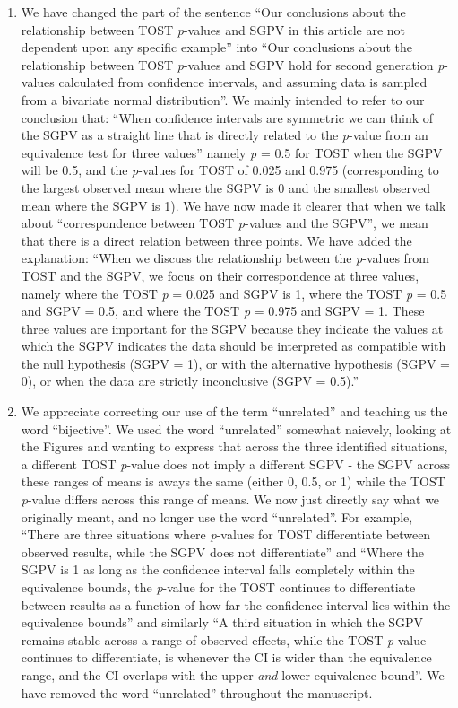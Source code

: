 \documentclass[man]{apa6}
\begin{document}
\begin{enumerate}
\def\labelenumi{\arabic{enumi}.}
\item
  We have changed the part of the sentence \enquote{Our conclusions about the relationship between TOST \emph{p}-values and SGPV in this article are not dependent upon any specific example} into \enquote{Our conclusions about the relationship between TOST \emph{p}-values and SGPV hold for second generation \emph{p}-values calculated from confidence intervals, and assuming data is sampled from a bivariate normal distribution}. We mainly intended to refer to our conclusion that: \enquote{When confidence intervals are symmetric we can think of the SGPV as a straight line that is directly related to the \emph{p}-value from an equivalence test for three values} namely \emph{p} = 0.5 for TOST when the SGPV will be 0.5, and the \emph{p}-values for TOST of 0.025 and 0.975 (corresponding to the largest observed mean where the SGPV is 0 and the smallest observed mean where the SGPV is 1). We have now made it clearer that when we talk about \enquote{correspondence between TOST \emph{p}-values and the SGPV}, we mean that there is a direct relation between three points. We have added the explanation: \enquote{When we discuss the relationship between the \emph{p}-values from TOST and the SGPV, we focus on their correspondence at three values, namely where the TOST \emph{p} = 0.025 and SGPV is 1, where the TOST \emph{p} = 0.5 and SGPV = 0.5, and where the TOST \emph{p} = 0.975 and SGPV = 1. These three values are important for the SGPV because they indicate the values at which the SGPV indicates the data should be interpreted as compatible with the null hypothesis (SGPV = 1), or with the alternative hypothesis (SGPV = 0), or when the data are strictly inconclusive (SGPV = 0.5).}
\item
  We appreciate correcting our use of the term \enquote{unrelated} and teaching us the word \enquote{bijective}. We used the word \enquote{unrelated} somewhat naievely, looking at the Figures and wanting to express that across the three identified situations, a different TOST \emph{p}-value does not imply a different SGPV - the SGPV across these ranges of means is aways the same (either 0, 0.5, or 1) while the TOST \emph{p}-value differs across this range of means. We now just directly say what we originally meant, and no longer use the word \enquote{unrelated}. For example, \enquote{There are three situations where \emph{p}-values for TOST differentiate between observed results, while the SGPV does not differentiate} and \enquote{Where the SGPV is 1 as long as the confidence interval falls completely within the equivalence bounds, the \emph{p}-value for the TOST continues to differentiate between results as a function of how far the confidence interval lies within the equivalence bounds} and similarly \enquote{A third situation in which the SGPV remains stable across a range of observed effects, while the TOST \emph{p}-value continues to differentiate, is whenever the CI is wider than the equivalence range, and the CI overlaps with the upper \emph{and} lower equivalence bound}. We have removed the word \enquote{unrelated} throughout the manuscript.

\end{enumerate}
\end{document}
